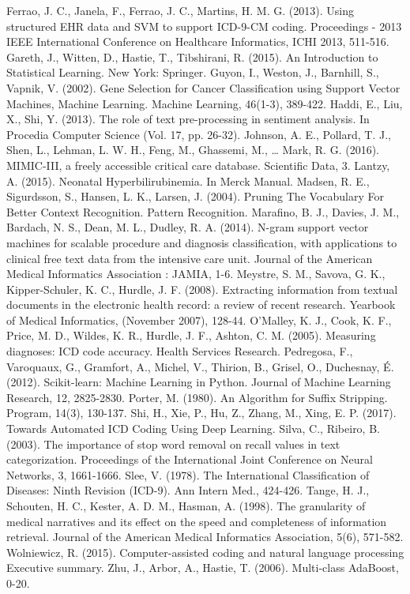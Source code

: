 \documentclass[conference]{IEEEtran}
\begin{document}
\begin{thebibliography}{00}
 Ferrao, J. C., Janela, F., Ferrao, J. C., Martins, H. M. G. (2013). Using structured EHR data and SVM to support ICD-9-CM coding. Proceedings - 2013 IEEE International Conference on Healthcare Informatics, ICHI 2013, 511-516.
 Gareth, J., Witten, D., Hastie, T., Tibshirani, R. (2015). An Introduction to Statistical Learning. New York: Springer.
 Guyon, I., Weston, J., Barnhill, S., Vapnik, V. (2002). Gene Selection for Cancer Classification using Support Vector Machines, Machine Learning. Machine Learning, 46(1-3), 389-422.
 Haddi, E., Liu, X., Shi, Y. (2013). The role of text pre-processing in sentiment analysis. In Procedia Computer Science (Vol. 17, pp. 26-32).
 Johnson, A. E., Pollard, T. J., Shen, L., Lehman, L. W. H., Feng, M., Ghassemi, M., … Mark, R. G. (2016). MIMIC-III, a freely accessible critical care database. Scientific Data, 3.
 Lantzy, A. (2015). Neonatal Hyperbilirubinemia. In Merck Manual.
 Madsen, R. E., Sigurdsson, S., Hansen, L. K., Larsen, J. (2004). Pruning The Vocabulary For Better Context Recognition. Pattern Recognition.
 Marafino, B. J., Davies, J. M., Bardach, N. S., Dean, M. L., Dudley, R. A. (2014). N-gram support vector machines for scalable procedure and diagnosis classification, with applications to clinical free text data from the intensive care unit. Journal of the American Medical Informatics Association : JAMIA, 1-6.
 Meystre, S. M., Savova, G. K., Kipper-Schuler, K. C., Hurdle, J. F. (2008). Extracting information from textual documents in the electronic health record: a review of recent research. Yearbook of Medical Informatics, (November 2007), 128-44.
 O’Malley, K. J., Cook, K. F., Price, M. D., Wildes, K. R., Hurdle, J. F., Ashton, C. M. (2005). Measuring diagnoses: ICD code accuracy. Health Services Research.
 Pedregosa, F., Varoquaux, G., Gramfort, A., Michel, V., Thirion, B., Grisel, O., Duchesnay, É. (2012). Scikit-learn: Machine Learning in Python. Journal of Machine Learning Research, 12, 2825-2830.
 Porter, M. (1980). An Algorithm for Suffix Stripping. Program, 14(3), 130-137.
 Shi, H., Xie, P., Hu, Z., Zhang, M., Xing, E. P. (2017). Towards Automated ICD Coding Using Deep Learning.
 Silva, C., Ribeiro, B. (2003). The importance of stop word removal on recall values in text categorization. Proceedings of the International Joint Conference on Neural Networks, 3, 1661-1666.
 Slee, V. (1978). The International Classification of Diseases: Ninth Revision (ICD-9). Ann Intern Med., 424-426.
 Tange, H. J., Schouten, H. C., Kester, A. D. M., Hasman, A. (1998). The granularity of medical narratives and its effect on the speed and completeness of information retrieval. Journal of the American Medical Informatics Association, 5(6), 571-582.
 Wolniewicz, R. (2015). Computer-assisted coding and natural language processing Executive summary.
 Zhu, J., Arbor, A., Hastie, T. (2006). Multi-class AdaBoost, 0-20.

\end{thebibliography}
\end{document}
